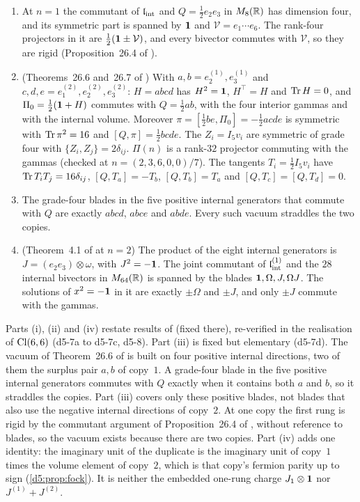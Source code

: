 \begin{proposition}
\label{d5:prop:vacuum}
\begin{enumerate}[label=(\roman*),leftmargin=2.2em]
\item At $n=1$ the commutant of $\mathfrak l_{\rm int}$ and $Q=\tfrac12e_2e_3$ in $M_8(\mathbb{R})$ has dimension four, and its symmetric part is
spanned by $\mathbf 1$ and $\mathcal V=e_1\cdots e_6$. The rank-four projectors in it are $\tfrac12(\mathbf 1\pm\mathcal V)$, and every bivector commutes with
$\mathcal V$, so they are rigid (Proposition~26.4 of \cite{ES17}).
\item (Theorems~26.6 and~26.7 of \cite{ES17}) With $a,b=e^{(1)}_2,e^{(1)}_3$ and $c,d,e=e^{(2)}_1,e^{(2)}_2,e^{(2)}_3$: $H=abcd$ has $H^2=\mathbf 1$, $H^{\!\top}=H$
and $\operatorname{Tr} H=0$, and $\Pi_0=\tfrac12(\mathbf 1+H)$ commutes with $Q=\tfrac12ab$, with the four interior gammas and with the internal volume. Moreover
$\pi=[\tfrac12be,\Pi_0]=-\tfrac12acde$ is symmetric with $\operatorname{Tr}\pi^2=16$ and $[Q,\pi]=\tfrac12bcde$. The $Z_i=I_5v_i$ are symmetric of grade four with
$\{Z_i,Z_j\}=2\delta_{ij}$. $\Pi(n)$ is a rank-$32$ projector commuting with the gammas (checked at $n=(2,3,6,0,0)/7$). The tangents
$T_i=\tfrac12I_5v_i$ have $\operatorname{Tr} T_iT_j=16\delta_{ij}$, $[Q,T_a]=-T_b$, $[Q,T_b]=T_a$ and $[Q,T_c]=[Q,T_d]=0$.
\item The grade-four blades in the five positive internal generators that commute with $Q$ are exactly $abcd$, $abce$ and $abde$. Every
such vacuum straddles the two copies.
\item (Theorem~4.1 of \cite{ES17} at $n=2$) The product of the eight internal generators is $J=(e_2e_3)\otimes\omega$, with $J^2=-\mathbf 1$. The joint commutant
of $\mathfrak l_{\rm int}^{(1)}$ and the $28$ internal bivectors in $M_{64}(\mathbb{R})$ is spanned by the blades $\mathbf 1,\Omega,J,\Omega J$. The solutions of $x^2=-\mathbf 1$ in it are
exactly $\pm\Omega$ and $\pm J$, and only $\pm J$ commute with the gammas.
\end{enumerate}
\end{proposition}

Parts (i), (ii) and (iv) restate results of \cite{ES17} (fixed there), re-verified in the realisation of $\mathrm{Cl}(6,6)$ (d5-7a to d5-7c, d5-8).
Part (iii) is fixed but elementary (d5-7d). The vacuum of Theorem~26.6 of \cite{ES17} is built on four positive internal directions, two of them the surplus pair $a,b$ of copy~$1$. A
grade-four blade in the five positive internal generators commutes with $Q$ exactly when it contains both $a$ and $b$, so it straddles the copies.
Part (iii) covers only these positive blades, not blades that also use the negative internal directions of copy~$2$. At one copy the first rung is
rigid by the commutant argument of Proposition~26.4 of \cite{ES17}, without reference to blades, so the vacuum exists because there are two copies. Part (iv) adds one
identity: the imaginary unit of the duplicate is the imaginary unit of copy~$1$ times the volume element of copy~$2$, which is that copy's
fermion parity up to sign (\cref{d5:prop:fock}). It is neither the embedded one-rung charge $J_1\otimes\mathbf 1$ nor $J^{(1)}+J^{(2)}$.

